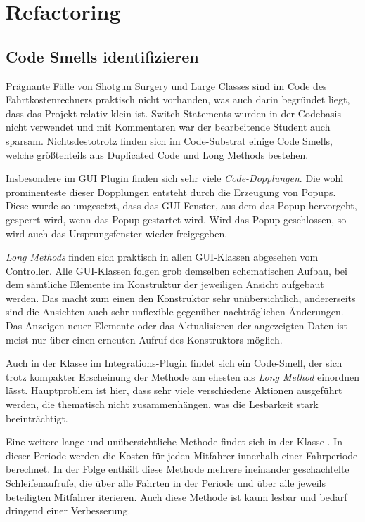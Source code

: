 \chapter{Refactoring}

\section{Code Smells identifizieren}
Prägnante Fälle von Shotgun Surgery und Large Classes sind im Code des Fahrtkostenrechners praktisch nicht vorhanden, was auch darin begründet liegt, dass das Projekt relativ klein ist.
Switch Statements wurden in der Codebasis nicht verwendet und mit Kommentaren war der bearbeitende Student auch sparsam.
Nichtsdestotrotz finden sich im Code-Substrat einige Code Smells, welche größtenteils aus Duplicated Code und Long Methods bestehen.

Insbesondere im GUI Plugin finden sich sehr viele \emph{Code-Dopplungen}.
Die wohl prominenteste dieser Dopplungen entsteht durch die \href{https://github.com/yschiebelhut/carpool-java/blob/6a206569e676ad1bf55d68ba3e64408bae83e73f/0-carpool-java-plugin-ui/src/main/java/gui/MainGUI.java#L42}{Erzeugung von Popups}.
Diese wurde so umgesetzt, dass das GUI-Fenster, aus dem das Popup hervorgeht, gesperrt wird, wenn das Popup gestartet wird.
Wird das Popup geschlossen, so wird auch das Ursprungsfenster wieder freigegeben.

\emph{Long Methods} finden sich praktisch in allen GUI-Klassen abgesehen vom Controller.
Alle GUI-Klassen folgen grob demselben schematischen Aufbau, bei dem sämtliche Elemente im Konstruktur der jeweiligen Ansicht aufgebaut werden.
Das macht zum einen den Konstruktor sehr unübersichtlich, andererseits sind die Ansichten auch sehr unflexible gegenüber nachträglichen Änderungen.
Das Anzeigen neuer Elemente oder das Aktualisieren der angezeigten Daten ist meist nur über einen erneuten Aufruf des Konstruktors möglich.

Auch in der Klasse  im Integrations-Plugin findet sich ein Code-Smell, der sich trotz kompakter Erscheinung der Methode am ehesten als \emph{Long Method} einordnen lässt.
Hauptproblem ist hier, dass sehr viele verschiedene Aktionen ausgeführt werden, die thematisch nicht zusammenhängen, was die Lesbarkeit stark beeinträchtigt.

Eine weitere lange und unübersichtliche Methode findet sich in der Klasse \href{https://github.com/yschiebelhut/carpool-java/blob/379784c1ffe99a3f4fc15f393e12661479e6a4bf/3-carpool-java-domain/src/main/java/model/Fahrperiode.java#L85}{}.
In dieser Periode werden die Kosten für jeden Mitfahrer innerhalb einer Fahrperiode berechnet.
In der Folge enthält diese Methode mehrere ineinander geschachtelte Schleifenaufrufe, die über alle Fahrten in der Periode und über alle jeweils beteiligten Mitfahrer iterieren.
Auch diese Methode ist kaum lesbar und bedarf dringend einer Verbesserung.

